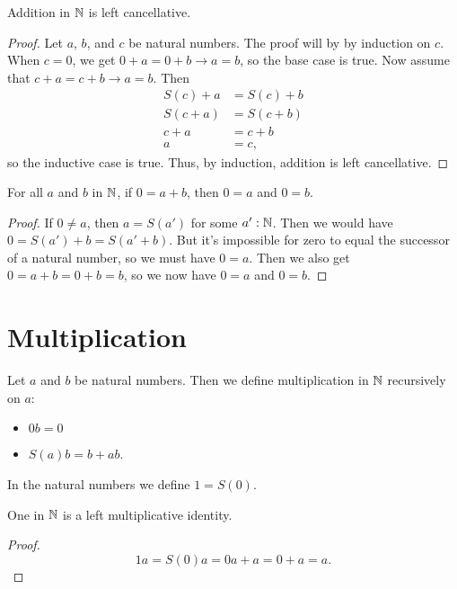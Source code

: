 \documentclass[../math.tex]{subfiles}
\begin{document}
\begin{instance}
    Addition in $\mathbb{N}$ is left cancellative.
\end{instance}
\begin{proof}
    Let $a$, $b$, and $c$ be natural numbers.  The proof will by by induction on
    $c$.  When $c = 0$, we get $0 + a = 0 + b \rightarrow a = b$, so the base
    case is true.  Now assume that $c + a = c + b \rightarrow a = b$.  Then
    \begin{align*}
        S(c) + a &= S(c) + b \\
        S(c + a) &= S(c + b) \\
        c + a &= c + b \\
        a &= c,
    \end{align*}
    so the inductive case is true.  Thus, by induction, addition is left
    cancellative.
\end{proof}

\begin{theorem}
    For all $a$ and $b$ in $\mathbb{N}$, if $0 = a + b$, then $0 = a$ and $0 = b$.
\end{theorem}
\begin{proof}
    If $0 \neq a$, then $a = S(a')$ for some $a' : \mathbb{N}$.  Then we would have $0 =
    S(a') + b = S(a' + b)$.  But it's impossible for zero to equal the successor
    of a natural number, so we must have $0 = a$.  Then we also get $0 = a + b =
    0 + b = b$, so we now have $0 = a$ and $0 = b$.
\end{proof}

\section{Multiplication}

\begin{instance}
    Let $a$ and $b$ be natural numbers.  Then we define multiplication in $\mathbb{N}$
    recursively on $a$:
    \begin{itemize}
        \item $0b = 0$
        \item $S(a)b = b + ab$.
    \end{itemize}
\end{instance}

\begin{instance}
    In the natural numbers we define $1 = S(0)$.
\end{instance}

\begin{instance}
    One in $\mathbb{N}$ is a left multiplicative identity.
\end{instance}
\begin{proof}
    \[
        1a = S(0)a = 0a + a = 0 + a = a.
    \]
\end{proof}
\end{document}
